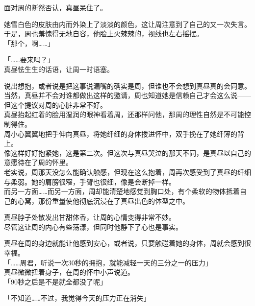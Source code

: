 面对周的断然否认，真昼呆住了。

她雪白色的皮肤由内而外染上了淡淡的颜色，这让周注意到了自己的又一次失言。\\

于是，周也羞愧得无地自容，他脸上火辣辣的，视线也左右摇摆。\\

「那个，啊……」

「……要来吗？」\\

真昼怯生生的话语，让周一时语塞。

说出想抱，或者说是把这事说漏嘴的确实是周，但谁也不会想到真昼真的会同意。\\

当然，真昼并不会对谁都做出这样的邀请，周也知道她是信赖自己才会这么说——但这个提议对周的心脏非常不好。\\

真昼抬起红着的脸用湿润的眼神看着周，还那样问他，那周的理性自然是不可能控制得住。\\

周小心翼翼地把手伸向真昼，将她纤细的身体搂进怀中，双手挽在了她纤薄的背上。\\

像这样好好抱紧她，这是第二次。但这次与真昼哭泣的那天不同，是真昼以自己的意愿待在了周的怀里。\\

老实说，周那天没怎么能确认触感，但现在这么抱着，周再次感受到了真昼的纤细与柔弱。她的肩膀很窄，手臂也很细，像是会断掉一样。\\

而另一方面……而另一方面，周却能清楚地感觉到胸口处，有个柔软的物体抵着自己的心窝，那份重量使他彻底沉浸在了真昼出色的体型之中。

真昼脖子处散发出甘甜体香，让周的心情变得非常不妙。\\

尽管这让周的内心有些荡漾，但同时他静下了心也是事实。

真昼在周的身边就能让他感到安心，或者说，只要触碰着她的身体，周就会感到很幸福。\\

「……周君，听说一次30秒的拥抱，就能减轻一天的三分之一的压力」\\

真昼微微扭着身子，在周的怀中小声说道。\\

「90秒之后是不是就全都没了呢」

「不知道……不过，我觉得今天的压力正在消失」


